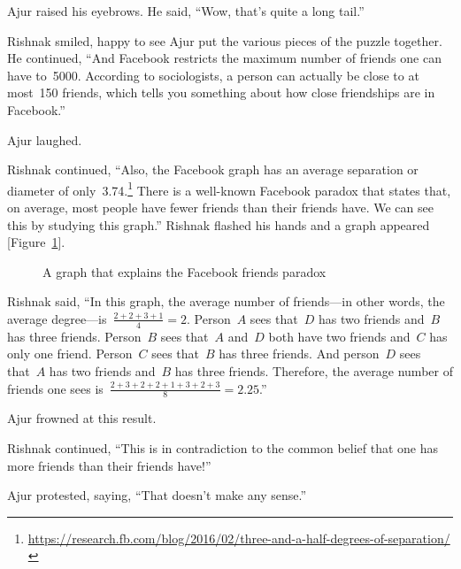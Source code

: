 Ajur raised his eyebrows. He said, ``Wow, that's quite a long tail.''

Rishnak smiled, happy to see Ajur put the various pieces of the puzzle together. He continued, ``And Facebook restricts the maximum number of friends one can have to~5000. According to sociologists, a person can actually be close to at most~150 friends, which tells you something about how close friendships are in Facebook.''

Ajur laughed.

Rishnak continued, ``Also, the Facebook graph has an average separation or diameter of only~3.74.\footnote{\url{https://research.fb.com/blog/2016/02/three-and-a-half-degrees-of-separation/}} There is a well-known Facebook paradox that states that, on average, most people have fewer friends than their friends have. We can see this by studying this graph.'' Rishnak flashed his hands and a graph appeared [Figure~\ref{21g1}].

\begin{figure}
\begin{center}
\caption{A graph that explains the Facebook friends paradox}\label{21g1}
\end{center}
\end{figure}

Rishnak said, ``In this graph, the average number of friends---in other words, the average degree---is~$\frac{2+2+3+1}{4}=2$.  Person~$A$ sees that~$D$ has two friends and~$B$ has three friends. Person~$B$ sees that~$A$ and~$D$ both have two friends and~$C$ has only one friend. Person~$C$ sees that~$B$ has three friends. And person~$D$ sees that~$A$ has two friends and~$B$ has three friends. Therefore, the average number of friends one sees is~$\frac{2+3+2+2+1+3+2+3}{8}=2.25$.''

Ajur frowned at this result.

Rishnak continued, ``This is in contradiction to the common belief that one has more friends than their friends have!''

Ajur protested, saying, ``That doesn't make any sense.''

